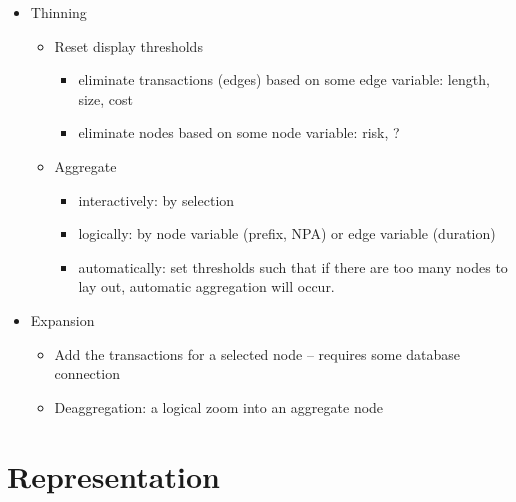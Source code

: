 \documentclass[11pt]{article}
\begin{document}
\begin{itemize} \itemsep 0em
\item Thinning
   \begin{itemize} \itemsep 0em
   \item Reset display thresholds
     \begin{itemize} \itemsep 0em
     \item eliminate transactions (edges) based on some edge variable:
           length, size, cost
     \item eliminate nodes based on some node variable: risk, ?
     \end{itemize}
   \item Aggregate
     \begin{itemize} \itemsep 0em
     \item interactively: by selection
     \item logically: by node variable (prefix, NPA) or edge
           variable (duration)
     \item automatically: set thresholds such that if there are
           too many nodes to lay out, automatic aggregation will
           occur.
     \end{itemize}
   \end{itemize}

\item Expansion
   \begin{itemize} \itemsep 0em
   \item Add the transactions for a selected node --
       requires some database connection
   \item Deaggregation: a logical zoom into an aggregate node
   \end{itemize}

\end{itemize}
   
\section {Representation}
\end{document}
